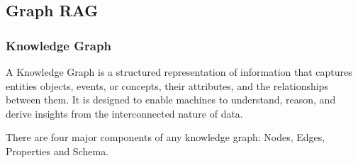 \documentclass[letterpaper,11pt,english]{sphinxmanual}
\begin{document}
\subsection{Graph RAG}
\label{\detokenize{rag:graph-rag}}

\subsubsection{Knowledge Graph}
\label{\detokenize{rag:knowledge-graph}}
\sphinxAtStartPar
A Knowledge Graph is a structured representation of information that captures entities \textendash{}objects, events,
or concepts, their attributes, and the relationships between them. It is designed to enable machines
to understand, reason, and derive insights from the interconnected nature of data.

\sphinxAtStartPar
There are four major components of any knowledge graph: Nodes, Edges, Properties and Schema.
\end{document}
